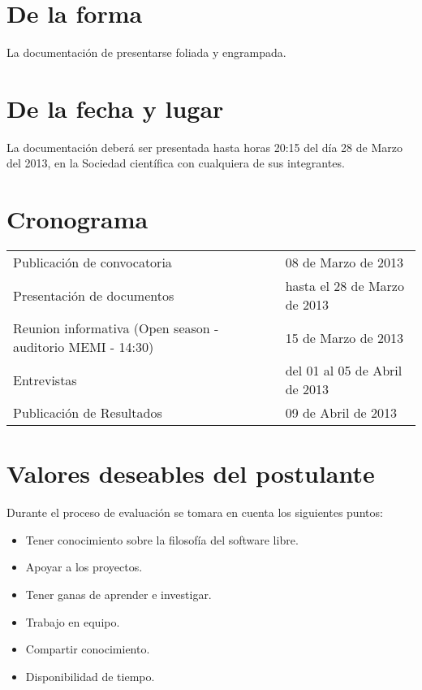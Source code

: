 \documentclass[letter,12pt]{article}
\begin{document}
\section*{De la forma}
La documentación de presentarse foliada y engrampada.

\section*{De la fecha y lugar}
La documentación deberá ser presentada hasta horas 20:15 del día 28 de Marzo del 2013, en la Sociedad científica con cualquiera de sus integrantes.

\section*{Cronograma}
\begin{tabular}{|p{6.5cm}|l|}
\hline
Publicación de convocatoria & 08 de Marzo de 2013 \\
Presentación de documentos & hasta el 28 de Marzo de 2013 \\
Reunion informativa (Open season - auditorio MEMI - 14:30) & 15 de Marzo de 2013 \\
Entrevistas & del 01 al 05 de Abril de 2013 \\
Publicación de Resultados & 09 de Abril de 2013 \\
\hline
\end{tabular}

\section*{Valores deseables del postulante}
Durante el proceso de evaluación se tomara en cuenta los siguientes puntos:

\begin{itemize}
\item Tener conocimiento sobre la filosofía del software libre.
\item Apoyar a los proyectos.
\item Tener ganas de aprender e investigar.
\item Trabajo en equipo.
\item Compartir conocimiento.
\item Disponibilidad de tiempo.
\end{itemize}
\end{document}

